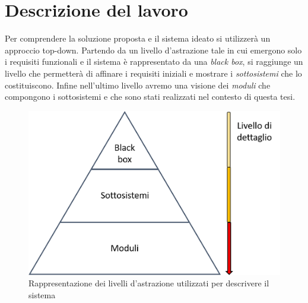 \chapter{Descrizione del lavoro}
\label{scenario}
Per comprendere la soluzione proposta e il sistema ideato si utilizzerà un approccio top-down. Partendo da un livello d'astrazione tale in cui emergono solo i requisiti funzionali e il sistema è rappresentato da una \textit{black box}, si raggiunge un livello che permetterà di affinare i requisiti iniziali e mostrare i \textit{sottosistemi} che lo costituiscono. Infine nell'ultimo livello avremo una visione dei \textit{moduli} che compongono i sottosistemi e che sono stati realizzati nel contesto di questa tesi.
\begin{figure}[H]
	\centering
	\includegraphics[scale=0.4]{DescrizioneDelSistema/livelli_astrazione.png}
	\caption{Rappresentazione dei livelli d'astrazione utilizzati per descrivere il sistema }
	\label{fig:livelliAstrazione}
\end{figure}
\newpage

